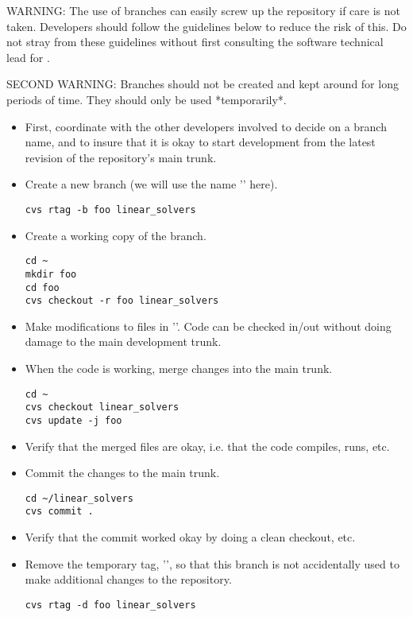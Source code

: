 WARNING: The use of branches can easily screw up the repository if
care is not taken.  Developers should follow the guidelines below to
reduce the risk of this.  Do not stray from these guidelines without
first consulting the software technical lead for \hypre{}.

SECOND WARNING: Branches should not be created and kept around for
long periods of time.  They should only be used *temporarily*.

\begin{itemize}

\item First, coordinate with the other developers involved to decide
on a branch name, and to insure that it is okay to start development
from the latest revision of the repository's main trunk.

\item Create a new branch (we will use the name '' here).
\begin{verbatim}
cvs rtag -b foo linear_solvers
\end{verbatim}

\item Create a working copy of the branch.
\begin{verbatim}
cd ~
mkdir foo
cd foo
cvs checkout -r foo linear_solvers
\end{verbatim}

\item Make modifications to files in ''.
Code can be checked in/out without doing damage to the main
development trunk.

\item When the code is working, merge changes into the main trunk.
\begin{verbatim}
cd ~
cvs checkout linear_solvers
cvs update -j foo
\end{verbatim}

\item Verify that the merged files are okay, i.e. that the code compiles,
runs, etc.

\item Commit the changes to the main trunk.
\begin{verbatim}
cd ~/linear_solvers
cvs commit .
\end{verbatim}

\item Verify that the commit worked okay by doing a clean checkout, etc.

\item Remove the temporary tag, '', so that this branch is
not accidentally used to make additional changes to the repository.
\begin{verbatim}
cvs rtag -d foo linear_solvers
\end{verbatim}

\end{itemize}
